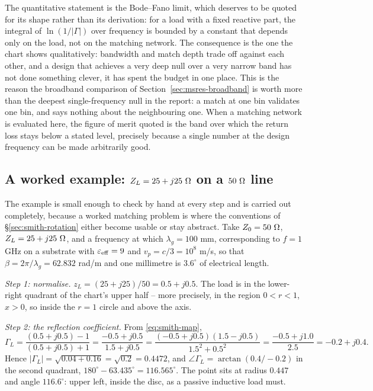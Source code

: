 The quantitative statement is the Bode--Fano limit, which deserves to be quoted for its shape rather than its
derivation: for a load with a fixed reactive part, the integral of $\ln(1/|\Gamma|)$ over frequency is bounded by
a constant that depends only on the load, not on the matching network. The consequence is the one the chart shows
qualitatively: bandwidth and match depth trade off against each other, and a design that achieves a very deep
null over a very narrow band has not done something clever, it has spent the budget in one place. This is the
reason the broadband comparison of Section~\ref{sec:msres-broadband} is worth more than the deepest single-frequency
null in the report: a match at one bin validates one bin, and says nothing about the neighbouring one. When a
matching network is evaluated here, the figure of merit quoted is the band over which the return loss stays below
a stated level, precisely because a single number at the design frequency can be made arbitrarily good.

\subsection{A worked example: $Z_L=25+j25\ \Omega$ on a $50\ \Omega$ line}
\label{sec:smith-example}

The example is small enough to check by hand at every step and is carried out completely, because a worked
matching problem is where the conventions of \S\ref{sec:smith-rotation} either become usable or stay abstract.
Take $Z_0=50\ \Ohm$, $Z_L=25+j25\ \Omega$, and a frequency at which $\lambda_g=100$ mm, corresponding to
$f=1$ GHz on a substrate with $\varepsilon_{\mathrm{eff}}=9$ and $v_p=c/3=10^{8}$ m/s, so that
$\beta=2\pi/\lambda_g=62.832$ rad/m and one millimetre is $3.6^\circ$ of electrical length.

\emph{Step 1: normalise.} $z_L=(25+j25)/50=0.5+j0.5$. The load is in the lower-right quadrant of the chart's
upper half -- more precisely, in the region $0<r<1$, $x>0$, so inside the $r=1$ circle and above the axis.

\emph{Step 2: the reflection coefficient.} From \eqref{eq:smith-map},
\begin{equation}
  \Gamma_L = \frac{(0.5+j0.5)-1}{(0.5+j0.5)+1}
           = \frac{-0.5+j0.5}{1.5+j0.5}
           = \frac{(-0.5+j0.5)(1.5-j0.5)}{1.5^2+0.5^2}
           = \frac{-0.5+j1.0}{2.5} = -0.2+j0.4 .
  \label{eq:smith-ex-gamma}
\end{equation}
Hence $|\Gamma_L|=\sqrt{0.04+0.16}=\sqrt{0.2}=0.4472$, and $\angle\Gamma_L=\arctan(0.4/-0.2)$ in the second
quadrant, $180^\circ-63.435^\circ=116.565^\circ$. The point sits at radius $0.447$ and angle $116.6^\circ$: upper
left, inside the disc, as a passive inductive load must.

